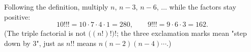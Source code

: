 Following the definition, multiply $n$, $n-3$, $n-6$, $\dots$ while the factors stay positive:
\[
10!!!=10\cdot7\cdot4\cdot1=\boxed{280},\qquad 9!!!=9\cdot6\cdot3=\boxed{162}.
\]
(The triple factorial is not $\bigl((n!)!\bigr)!$; the three exclamation marks mean "step down by $3$", just as $n!!$ means $n(n-2)(n-4)\cdots$.)
